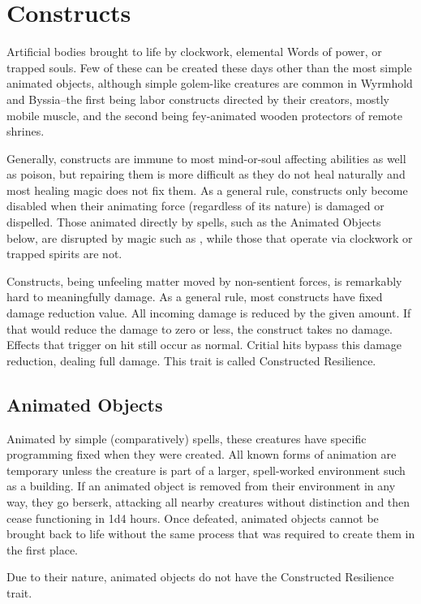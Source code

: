 \clearpage
\section{Constructs}
Artificial bodies brought to life by clockwork, elemental Words of power, or trapped souls. Few of these can be created these days other than the most simple animated objects, although simple golem-like creatures are common in Wyrmhold and Byssia--the first being labor constructs directed by their creators, mostly mobile muscle, and the second being fey-animated wooden protectors of remote shrines.

Generally, constructs are immune to most mind-or-soul affecting abilities as well as poison, but repairing them is more difficult as they do not heal naturally and most healing magic does not fix them. As a general rule, constructs only become disabled when their animating force (regardless of its nature) is damaged or dispelled. Those animated directly by spells, such as the Animated Objects below, are disrupted by magic such as , while those that operate via clockwork or trapped spirits are not.

Constructs, being unfeeling matter moved by non-sentient forces, is remarkably hard to meaningfully damage. As a general rule, most constructs have fixed damage reduction value. All incoming damage is reduced by the given amount. If that would reduce the damage to zero or less, the construct takes no damage. Effects that trigger on hit still occur as normal. Critial hits bypass this damage reduction, dealing full damage. This trait is called Constructed Resilience.

\subsection{Animated Objects}

Animated by simple (comparatively) spells, these creatures have specific programming fixed when they were created. All known forms of animation are temporary unless the creature is part of a larger, spell-worked environment such as a building. If an animated object is removed from their environment in any way, they go berserk, attacking all nearby creatures without distinction and then cease functioning in 1d4 hours. Once defeated, animated objects cannot be brought back to life without the same process that was required to create them in the first place.

Due to their nature, animated objects do not have the Constructed Resilience trait.

